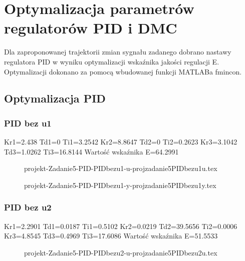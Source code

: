 \section{Optymalizacja parametrów regulatorów PID i DMC}
\label{projekt:zad5}


Dla zaproponowanej trajektorii zmian sygnału zadanego dobrano nastawy
regulatora PID w wyniku optymalizacji wskaźnika jakości regulacji E.
Optymalizacji dokonano za pomocą wbudowanej funkcji MATLABa fmincon.

\subsection{Optymalizacja PID}

\subsubsection{PID bez u1}
Kr1=2.438 Td1=0 Ti1=3.2542 Kr2=8.8647 Td2=0 Ti2=0.2623 Kr3=3.1042
Td3=1.0262 Ti3=16.8144
Wartość wskaźnika E=64.2991

\ifdefined\CompileFigures
\begin{figure}[H] 
    \centering
    
    \caption{projekt-Zadanie5-PID-PIDbezu1-u-projzadanie5PIDbezu1u.tex}
    \label{projekt:zad5:figure:projzadanie5PIDbezu1u}
\end{figure}
\fi

\ifdefined\CompileFigures
\begin{figure}[H] 
    \centering
    
    \caption{projekt-Zadanie5-PID-PIDbezu1-y-projzadanie5PIDbezu1y.tex}
    \label{projekt:zad5:figure:projzadanie5PIDbezu1y}
\end{figure}
\fi

\subsubsection{PID bez u2}
Kr1=2.2901 Td1=0.0187 Ti1=0.5102 
Kr2=0.0219 Td2=39.5656 Ti2=0.0006
Kr3=4.8545 Td3=0.4969 Ti3=17.6086 
Wartość wskaźnika E=51.5533

\ifdefined\CompileFigures
\begin{figure}[H] 
    \centering
    
    \caption{projekt-Zadanie5-PID-PIDbezu2-u-projzadanie5PIDbezu2u.tex}
    \label{projekt:zad5:figure:projzadanie5PIDbezu2u}
\end{figure}
\fi

